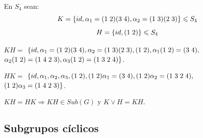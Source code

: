 \documentclass[11pt,a4paper]{article}
\begin{document}
En $S_{4}$ sean:
$$K = \{id, \alpha_{1} = (1 \hspace{0.1cm} 2)(3 \hspace{0.1cm} 4), \alpha_{2} = (1 \hspace{0.1cm} 3)(2 \hspace{0.1cm} 3) \} \leqslant S_{4}$$
$$H = \{id, (1 \hspace{0.1cm} 2) \} \leqslant S_{4}$$
\begin{enumerate*}
\item[$KH =$]  $\{id, \alpha_{1} = (1 \hspace{0.1cm} 2)(3 \hspace{0.1cm} 4), \alpha_{2} = (1 \hspace{0.1cm} 3)(2 \hspace{0.1cm} 3), (1 \hspace{0.1cm} 2), \alpha_{1} (1 \hspace{0.1cm} 2) = (3 \hspace{0.1cm} 4),$ \\ $\alpha_{2} (1 \hspace{0.1cm} 2) = (1 \hspace{0.1cm} 4 \hspace{0.1cm} 2 \hspace{0.1cm} 3), \alpha_{3}(1 \hspace{0.1cm} 2) = (1 \hspace{0.1cm} 3 \hspace{0.1cm} 2 \hspace{0.1cm} 4) \}$.
\item[$HK =$] $\{id, \alpha_{1}, \alpha_{2}, \alpha_{3}, (1 \hspace{0.1cm} 2), (1 \hspace{0.1cm} 2)\alpha_{1} = (3 \hspace{0.1cm} 4), (1 \hspace{0.1cm} 2) \alpha_{2} = (1 \hspace{0.1cm} 3 \hspace{0.1cm} 2 \hspace{0.1cm} 4),$ \\ $(1 \hspace{0.1cm} 2) \alpha_{3} = (1 \hspace{0.1cm} 4 \hspace{0.1cm} 2 \hspace{0.1cm} 3) \}$.
\end{enumerate*}

$KH = HK \Rightarrow KH \in Sub(G)$ y $K \vee H = KH$.

\subsection{Subgrupos cíclicos}
\end{document}
